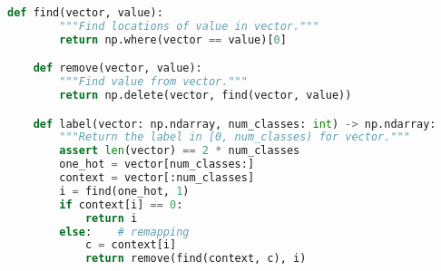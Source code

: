 \begin{lstlisting}[language=Python]
    def find(vector, value):
        """Find locations of value in vector."""
        return np.where(vector == value)[0]

    def remove(vector, value):
        """Find value from vector."""
        return np.delete(vector, find(vector, value))

    def label(vector: np.ndarray, num_classes: int) -> np.ndarray:
        """Return the label in [0, num_classes) for vector."""
        assert len(vector) == 2 * num_classes
        one_hot = vector[num_classes:]
        context = vector[:num_classes]
        i = find(one_hot, 1)
        if context[i] == 0:
            return i
        else:    # remapping
            c = context[i]
            return remove(find(context, c), i)
\end{lstlisting}

